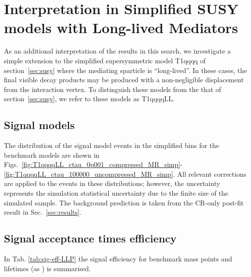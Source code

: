\section{Interpretation in Simplified SUSY models with Long-lived Mediators}
\label{sec:LLP}

As an additional interpretation of the results in this search, we investigate a simple extension to the 
simplified supersymmetric model T1qqqq of section~\ref{sec:susy} where the mediating sparticle is ``long-lived''.
In these cases, the final visible decay products may be produced with a non-negligible displacement from the interaction vertex.
To distinguish these models from the that of section~\ref{sec:susy}, we refer to these models as T1qqqqLL.


\subsection{Signal models}
\label{sec:LLP_models}


The distribution of the signal model events in the simplified bins for the
benchmark models are shown in Figs.~\ref{fig:T1qqqqLL_ctau_0p001_compressed_MR_simp}-\ref{fig:T1qqqqLL_ctau_100000_uncompressed_MR_simp}.
All relevant corrections are applied to the events in these distributions;
however, the uncertainty represents the simulation statistical uncertainty due
to the finite size of the simulated sample. The background prediction is taken
from the CR-only post-fit result in Sec.~\ref{sec:results}.

\clearpage
\subsection{Signal acceptance times efficiency}
\label{sec:sig-accept-contam-LLP}

In Tab. \ref{tab:sig-eff-LLP} the signal efficiency for benchmark mass
points and lifetimes (as \ctau) is summarised.

